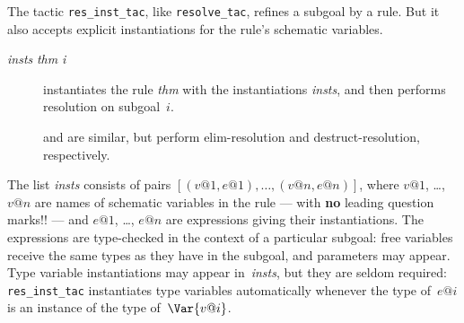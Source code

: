 The tactic {\tt res_inst_tac}, like {\tt resolve_tac}, refines a subgoal by
a rule.  But it also accepts explicit instantiations for the rule's
schematic variables.  
\begin{description}
\item[ {\it insts} {\it thm} {\it i}]
instantiates the rule {\it thm} with the instantiations {\it insts}, and
then performs resolution on subgoal~$i$.

\item[] 
and  are similar, but perform elim-resolution
and destruct-resolution, respectively.
\end{description}
The list {\it insts} consists of pairs $[(v@1,e@1), \ldots, (v@n,e@n)]$,
where $v@1$, \ldots, $v@n$ are names of schematic variables in the rule ---
with {\bf no} leading question marks!! --- and $e@1$, \ldots, $e@n$ are
expressions giving their instantiations.  The expressions are type-checked
in the context of a particular subgoal: free variables receive the same
types as they have in the subgoal, and parameters may appear.  Type
variable instantiations may appear in~{\it insts}, but they are seldom
required: {\tt res_inst_tac} instantiates type variables automatically
whenever the type of~$e@i$ is an instance of the type of~$\Var{v@i}$.

